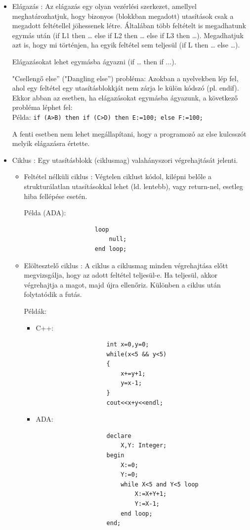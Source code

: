 \documentclass[12pt,margin=0px]{article}
\begin{document}
	\begin{itemize}
		\item	Elágazás : Az elágazás egy olyan vezérlési szerkezet, amellyel meghatározhatjuk, hogy bizonyos
		(blokkban megadott) utasítások csak a megadott feltétellel jöhessenek létre.
		Általában több feltételt is megadhatunk egymás után (if L1 then … else if L2 then … else if L3 then …).
		Megadhatjuk azt is, hogy mi történjen, ha egyik feltétel sem teljesül (if L then … else …).
	
		Elágazásokat lehet egymásba ágyazni (if … then if ...).
		
		"Csellengő else” ("Dangling else”) probléma: Azokban a nyelvekben lép fel, ahol egy feltétel egy
		utasításblokkját nem zárja le külön kódszó (pl. endif). Ekkor abban az esetben, ha elágazásokat
		egymásba ágyazunk, a következő probléma léphet fel:\\
		Példa: \texttt{if (A>B) then if (C>D) then E:=100; else F:=100;}
		
		A fenti esetben nem lehet megállapítani, hogy a programozó az else kulcsszót melyik elágazásra
		értette.
		
		\item	Ciklus : Egy utasításblokk (ciklusmag) valahányszori végrehajtását jelenti.
		\begin{itemize}
			\item	Feltétel nélküli ciklus : Végtelen ciklust kódol, kilépni belőle a strukturálatlan utasításokkal lehet
			(ld. lentebb), vagy return-nel, esetleg hiba fellépése esetén.
			
			Példa (ADA):
{\small
				\begin{verbatim}
					loop
					    null;
					end loop;
				\end{verbatim}
}		
			\item	Elöltesztelő ciklus : A ciklus a ciklusmag minden végrehajtása előtt megvizsgálja, hogy az adott
			feltétel teljesül-e. Ha teljesül, akkor végrehajtja a magot, majd újra ellenőriz. Különben a ciklus
			után folytatódik a futás.
			
			Példák:
			\begin{itemize}
				\item	C++:
{\small
				\begin{verbatim}
					int x=0,y=0;
					while(x<5 && y<5)
					{
					    x+=y+1;
					    y=x-1;
					}
					cout<<x+y<<endl;
				\end{verbatim}
}				
				\item	ADA:
{\small
				\begin{verbatim}
					declare
					    X,Y: Integer;
					begin
					    X:=0;
					    Y:=0;
					    while X<5 and Y<5 loop
					        X:=X+Y+1;
					        Y:=X-1;
					    end loop;
					end;
				\end{verbatim}
}
			\end{itemize}
			

\end{itemize}
\end{itemize}
\end{document}
